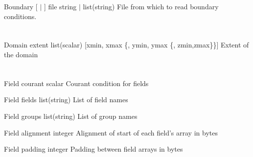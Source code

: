 \documentclass{book}
\begin{document}
\Parameter
{Boundary} 
{[  $|$  ]} 
{file} 
{string $|$ list(string)} 
{} 
{File from which to read boundary conditions.  } 
{} 
{}

\section{}

\Parameter
{Domain} 
{} 
{extent} 
{list(scalar)} 
{[xmin, xmax \{, ymin, ymax \{, zmin,zmax\}\}]}
{Extent of the domain} 
{} 
{}

\section{}

\Parameter
{Field} 
{} 
{courant} 
{scalar} 
{} 
{Courant condition for fields} 
{} 
{}

\Parameter
{Field} 
{} 
{fields} 
{list(string)} 
{} 
{List of field names} 
{} 
{}

\Parameter
{Field} 
{} 
{groups} 
{list(string)} 
{} 
{List of group names} 
{} 
{}

\Parameter
{Field}
{}
{alignment}
{integer}
{}
{Alignment of start of each field's array in bytes}
{}
{}

\Parameter
{Field}
{}
{padding}
{integer}
{}
{Padding between field arrays in bytes}
{}
{}
\end{document}
